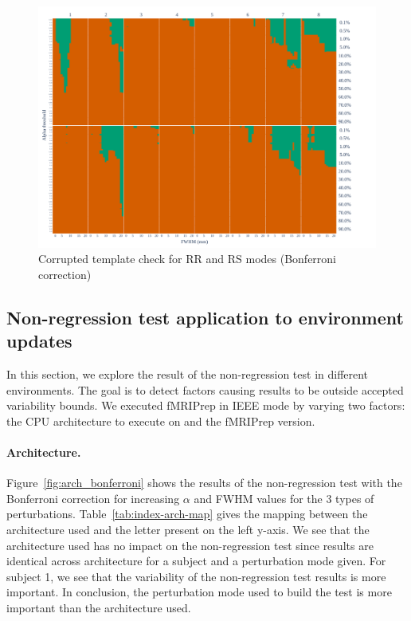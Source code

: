 \documentclass{article}
\newcommand{\fmriprep}{fMRIPrep\xspace}
\begin{document}
\begin{figure}
    \centering
    \includegraphics[width=\linewidth]{figures/template/template_fwe_bonferroni.pdf}
    \caption{Corrupted template check for RR and RS modes (Bonferroni correction)}
    \label{fig:template_bonferroni}
\end{figure}

\subsection{Non-regression test application to environment updates}

In this section, we explore the result of the non-regression test in different environments. The goal is to detect factors causing results to be outside accepted variability bounds. We executed \fmriprep in IEEE mode by varying two factors: the CPU architecture to execute on and the \fmriprep version.

\paragraph*{Architecture.} Figure~\ref{fig:arch_bonferroni} shows the results of the non-regression test with the Bonferroni correction for increasing $\alpha$ and FWHM values for the 3 types of perturbations. Table~\ref{tab:index-arch-map} gives the mapping between the architecture used and the letter present on the left y-axis. We see that the architecture used has no impact on the non-regression test since results are identical across architecture for a subject and a perturbation mode given. For subject 1, we see that the variability of the non-regression test results is more important. In conclusion, the perturbation mode used to build the test is more important than the architecture used.
\end{document}
